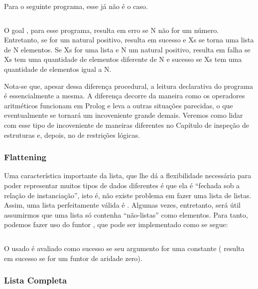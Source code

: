 Para o seguinte programa, esse já não é o caso.

\inputminted{prolog}{../Exemplos/Cap3/prog3_length2.pl}\label{lst:length2}

O goal , para esse programa, resulta em erro se N não for um número. Entretanto, se for um natural positivo,  resulta em sucesso e Xs se torna uma lista de N elementos. Se Xs for uma lista e N um natural positivo,  resulta em falha se Xs tem uma quantidade de elementos diferente de N e sucesso se Xs tem uma quantidade de elementos igual a N.

Nota-se que, apesar dessa diferença procedural, a leitura declarativa do programa é essencialmente a mesma. A diferença decorre da maneira como os operadores aritméticos funcionam em Prolog e leva a outras situações parecidas, o que eventualmente se tornará um incoveniente grande demais. Veremos como lidar com esse tipo de incoveniente de maneiras diferentes no Capítulo de inspeção de estruturas %
e, depois, no de restrições lógicas. %

\subsubsection{Flattening}

Uma característica importante da lista, que lhe dá a flexibilidade necessária para poder representar muitos tipos de dados diferentes
é que ela é ``fechada sob a relação de instanciação'', isto é, não existe problema em fazer uma lista de listas. Assim, uma lista
perfeitamente válida é \codigo{[[[a,b],c],[]]}. Algumas vezes, entretanto, será útil assumirmos que
uma lista  só contenha ``não-listas'' como elementos. Para tanto, podemos fazer uso do funtor
, que pode ser implementado como se segue:

\inputminted{prolog}{../Exemplos/Cap3/prog3_flatten.pl}\label{lst:flatten}

\noindent O  usado é avaliado como sucesso se seu argumento for uma constante ( resulta em sucesso
se  for um funtor de aridade zero).


\subsubsection{Lista Completa}


